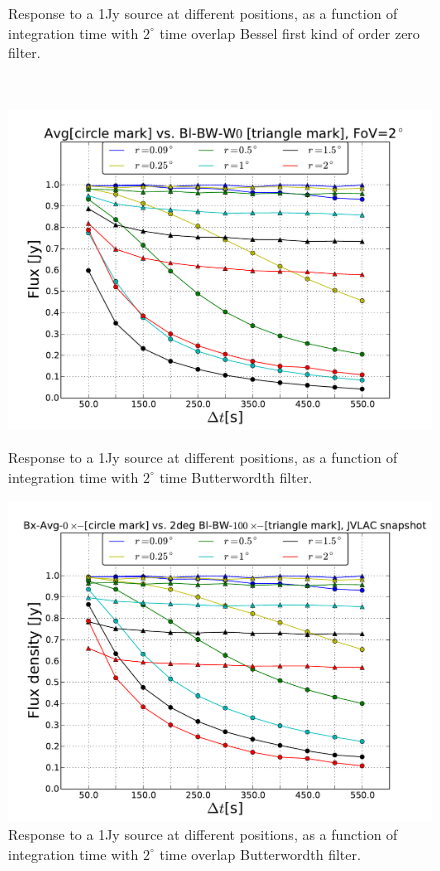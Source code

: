 \documentclass[useAMS,usenatbib]{mn2e}
\begin{document}
\begin{figure}
\begin{minipage}{0.38\linewidth}
    \caption{Response to a 1Jy source at different positions, as a function of integration time with $2^{\circ}$ time overlap 
      Bessel first kind of order zero filter.}
    \label{fig:max-integ-time-bessel-w100x1-fov2}\end{minipage}\\
\begin{minipage}{0.38\linewidth}\includegraphics[width=1\textwidth]{./Figures/max-integ-time-butter-w1x1-fov2.pdf}
    \caption{Response to a 1Jy source at different positions, as a function of integration time with $2^{\circ}$ time Butterwordth 
filter.}
    \label{fig:max-integ-time-butter-w1x1-fov2}
    \end{minipage} 
 \hspace{1cm}
\begin{minipage}{0.38\linewidth}\includegraphics[width=1\textwidth]{./Figures/max-integ-time-butter-w100x1-fov2.pdf}
    \caption{Response to a 1Jy source at different positions, as a function of integration time with $2^{\circ}$ time overlap 
      Butterwordth filter.}
    \label{fig:max-integ-time-butter-w100x1-fov2}\end{minipage}   
\end{figure}
\end{document}
